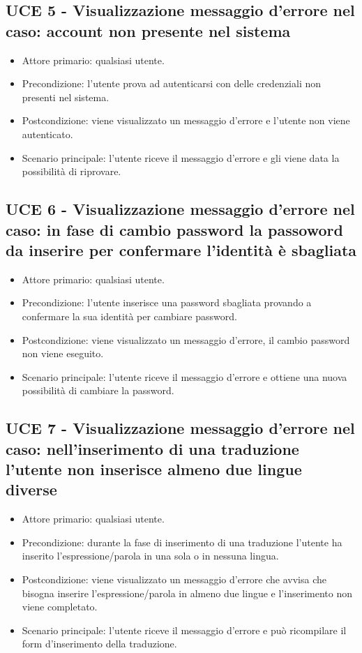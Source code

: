 \subsection{UCE 5 - Visualizzazione messaggio d'errore nel caso: account non presente nel sistema}
    \begin{itemize}
        \item Attore primario: qualsiasi utente.
        \item Precondizione: l'utente prova ad autenticarsi con delle credenziali non presenti nel sistema.
        \item Postcondizione: viene visualizzato un messaggio d'errore e l'utente non viene autenticato.
        \item Scenario principale: l'utente riceve il messaggio d'errore e gli viene data la possibilità di riprovare.
    \end{itemize}
\subsection{UCE 6 - Visualizzazione messaggio d'errore nel caso: in fase di cambio password la passoword da inserire per confermare l'identità è sbagliata}
    \begin{itemize}
        \item Attore primario: qualsiasi utente.
        \item Precondizione: l'utente inserisce una password sbagliata provando a confermare la sua identità per cambiare password.
        \item Postcondizione: viene visualizzato un messaggio d'errore, il cambio password non viene eseguito.
        \item Scenario principale: l'utente riceve il messaggio d'errore e ottiene una nuova possibilità di cambiare la password.
    \end{itemize}
\subsection{UCE 7 - Visualizzazione messaggio d'errore nel caso: nell'inserimento di una traduzione l'utente non inserisce almeno due lingue diverse}
    \begin{itemize}
        \item Attore primario: qualsiasi utente.
        \item Precondizione: durante la fase di inserimento di una traduzione l'utente ha inserito l'espressione/parola in una sola o in nessuna lingua.
        \item Postcondizione: viene visualizzato un messaggio d'errore che avvisa che bisogna inserire l'espressione/parola in almeno due lingue e l'inserimento non viene completato.
        \item Scenario principale: l'utente riceve il messaggio d'errore e può ricompilare il form d'inserimento della traduzione.
    \end{itemize}

